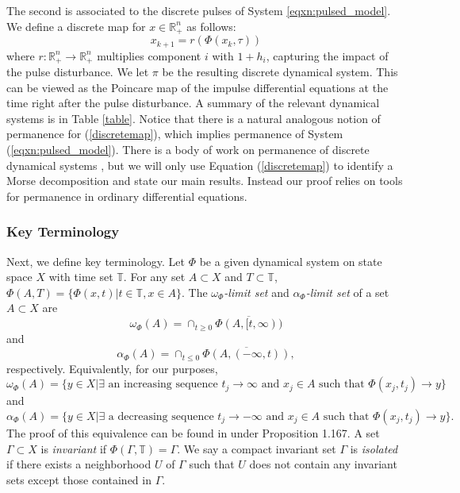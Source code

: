 \documentclass{article}
\theoremstyle{definition}
\newcommand{\T}{{\mathbb{T}}}
\newcommand{\swati}[1]{\textcolor{violet}{[SP: #1]}}
\begin{document}
The second is associated to the discrete pulses of System \ref{eqxn:pulsed_model}. We define a discrete map for $ x\in\mathbb{R}^n_+$ as follows:
\begin{equation}\label{discretemap}
x_{k+1}= r(\Phi(x_k, \tau))   
\end{equation}
where $r:\mathbb{R}^n_+ \rightarrow \mathbb{R}^n_+$ multiplies component $i$ with $1+h_i$, capturing the impact of the pulse disturbance. We let $\pi$ be the resulting discrete dynamical system. This can be viewed as the Poincare map of the impulse differential equations at the time right after the pulse disturbance. A summary of the relevant dynamical systems is in Table \ref{table}.  
Notice that there is a natural analogous notion of permanence for (\ref{discretemap}), which implies permanence of System (\ref{eqxn:pulsed_model}).  There is a body of work on permanence of discrete dynamical systems \cite{kon2004permanence, salceanu2009lyapunov}, but we will only use Equation (\ref{discretemap}) to identify a Morse decomposition and state our main results. Instead our proof relies on tools for permanence in ordinary differential equations.

\subsubsection{Key Terminology}
Next, we define key terminology. Let $\Phi$ be a given dynamical system on state space $X$ with time set $\mathbb{T}$. 
For any set $A\subset X$ and $T\subset \mathbb{T}$, $\Phi(A,T)= \{\Phi(x,t)| t\in \mathbb{T}, x\in A\}$. 
The \emph{$\omega_\Phi$-limit set} and  \emph{$\alpha_\Phi$-limit set} of a set $A\subset X$ are $$\omega_\Phi(A) = \cap_{t\geq 0}\overline{\Phi(A,[t,\infty))}$$ and $$\alpha_\Phi(A) = \cap_{t\leq 0}\overline{\Phi(A,(-\infty,t))},$$ respectively. Equivalently, for our purposes, 
$$\omega_\Phi(A) = \{y\in X | \exists \text{ an increasing sequence } t_j \rightarrow \infty \text{ and }  x_j \in A \text{ such that } \Phi(x_j, t_j)\rightarrow y \}$$
and 
$$\alpha_\Phi(A) = \{y\in X |\exists \text{ a decreasing sequence } t_j \rightarrow -\infty \text{ and }  x_j \in A \text{ such that } \Phi(x_j, t_j)\rightarrow y \}.$$ The proof of this equivalence can be found in \cite{chicone_odes_2006} under Proposition 1.167.
A set $\Gamma \subset X$ is \emph{invariant} if $\Phi(\Gamma, \T) = \Gamma$. 
We say a compact invariant set $\Gamma$ is \emph{isolated} if there exists a neighborhood $U$ of $\Gamma$ such that $U$ does not contain any invariant sets except those contained in $\Gamma$.  
\end{document}
